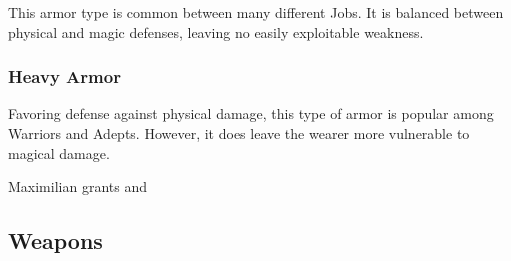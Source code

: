 This armor type is common between many different Jobs.  It is balanced between physical and magic defenses, leaving no easily exploitable weakness.

\begin{tabarm}[label=inv-marm]
    
\end{tabarm}

\clearpage
\subsubsection{Heavy Armor}

Favoring defense against physical damage, this type of armor is popular among Warriors and Adepts.  However, it does leave the wearer more vulnerable to magical damage.

\begin{tabarm}[label=inv-harm]
    
\end{tabarm}
{\footnotesize Maximilian grants  and }
\clearpage

\subsection{Weapons}\label{subsec:inv-weapons}

